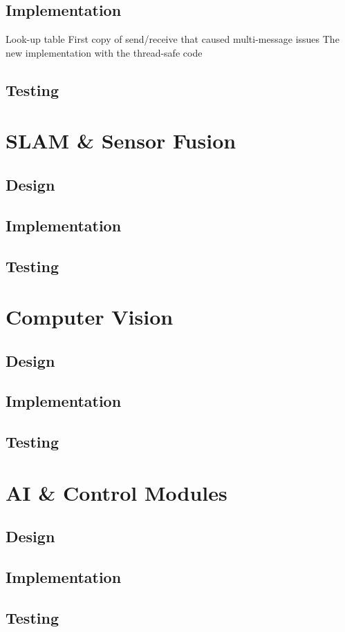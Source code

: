 \subsection{Implementation}\label{soft/comms/impl}
Look-up table
First copy of send/receive that caused multi-message issues
The new implementation with the thread-safe code

\subsection{Testing}\label{soft/comms/test}




\section{SLAM \& Sensor Fusion}\label{soft/SLAM}

\subsection{Design}\label{soft/SLAM/design}

\subsection{Implementation}\label{soft/SLAM/impl}

\subsection{Testing}\label{soft/SLAM/test}



\section{Computer Vision}\label{soft/cv}

\subsection{Design}\label{soft/cv/design}

\subsection{Implementation}\label{soft/cv/impl}

\subsection{Testing}\label{soft/cv/test}



\section{AI \& Control Modules}\label{soft/ai}

\subsection{Design}\label{soft/ai/design}

\subsection{Implementation}\label{soft/ai/impl}

\subsection{Testing}\label{soft/ai/test}